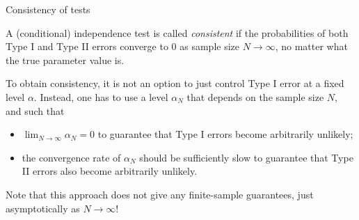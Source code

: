 \begin{frame}{Consistency of tests}
  \begin{Def}
  A (conditional) independence test is called \emph{consistent} if the probabilities of both Type I and Type II errors converge to 0 as sample size $N \to \infty$, no matter what the true parameter value is.
  \end{Def}

  To obtain consistency, it is not an option to just control Type I error at a fixed level $\alpha$. 
  Instead, one has to use a level $\alpha_N$ that depends on the sample size $N$, and such that
    \begin{itemize}
      \item $\lim_{N\to\infty} \alpha_N = 0$ to guarantee that Type I errors become arbitrarily unlikely;
      \item the convergence rate of $\alpha_N$ should be sufficiently slow to guarantee that
        Type II errors also become arbitrarily unlikely.
    \end{itemize}
  Note that this approach does not give any finite-sample guarantees, just asymptotically as $N \to \infty$!
\end{frame}


